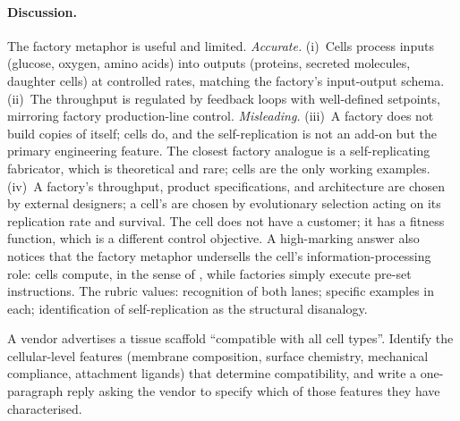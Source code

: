 \paragraph{Discussion.}
The factory metaphor is useful and limited. \emph{Accurate.}
(i)~Cells process inputs (glucose, oxygen, amino acids) into outputs
(proteins, secreted molecules, daughter cells) at controlled rates,
matching the factory's input-output schema. (ii)~The throughput is
regulated by feedback loops with well-defined setpoints, mirroring
factory production-line control. \emph{Misleading.}
(iii)~A factory does not build copies of itself; cells do, and the
self-replication is not an add-on but the primary engineering feature.
The closest factory analogue is a self-replicating fabricator, which
is theoretical and rare; cells are the only working examples. (iv)~A
factory's throughput, product specifications, and architecture are
chosen by external designers; a cell's are chosen by evolutionary
selection acting on its replication rate and survival. The cell does
not have a customer; it has a fitness function, which is a different
control objective. A high-marking answer also notices that the
factory metaphor undersells the cell's information-processing role:
cells compute, in the sense of \cite{paper:v6c01-bray-1995}, while
factories simply execute pre-set instructions. The rubric values:
recognition of both lanes; specific examples in each; identification
of self-replication as the structural disanalogy.

\begin{exercise}
A vendor advertises a tissue scaffold ``compatible with all cell
types''. Identify the cellular-level features (membrane composition,
surface chemistry, mechanical compliance, attachment ligands) that
determine compatibility, and write a one-paragraph reply asking the
vendor to specify which of those features they have characterised.
\end{exercise}


